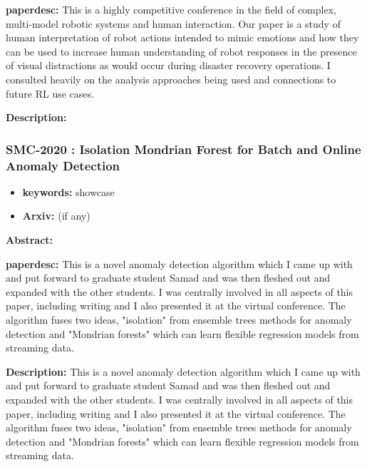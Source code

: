 \documentclass{article}
\begin{document}
\textbf{paperdesc:} This is a highly competitive conference in the field of complex, multi-model robotic systems and human interaction. Our paper is a study of human interpretation of robot actions intended to mimic emotions and how they can be used to increase human understanding of robot responses in the presence of visual distractions as would occur during disaster recovery operations. I consulted heavily on the analysis approaches being used and connections to future RL use cases.

\textbf{Description:} 



\newpage
\subsubsection{\textbf{SMC-2020} : Isolation Mondrian Forest for Batch and Online Anomaly Detection}
\begin{itemize}
\item \textbf{keywords:} showcase
\item \textbf{Arxiv:}  (if any)
\end{itemize}


\textbf{Abstract:} 

\textbf{paperdesc:} This is a novel anomaly detection algorithm which I came up with and put forward to graduate student Samad and was then fleshed out and expanded with the other students. I was centrally involved in all aspects of this paper, including writing and I also presented it at the virtual conference. The algorithm fuses two ideas, "isolation" from ensemble trees methods for anomaly detection and "Mondrian forests" which can learn flexible regression models from streaming data.

\textbf{Description:} This is a novel anomaly detection algorithm which I came up with and put forward to graduate student Samad and was then fleshed out and expanded with the other students. I was centrally involved in all aspects of this paper, including writing and I also presented it at the virtual conference. 
    The algorithm fuses two ideas, "isolation" from ensemble trees methods for anomaly detection and "Mondrian forests" which can learn flexible regression models from streaming data.
\end{document}
